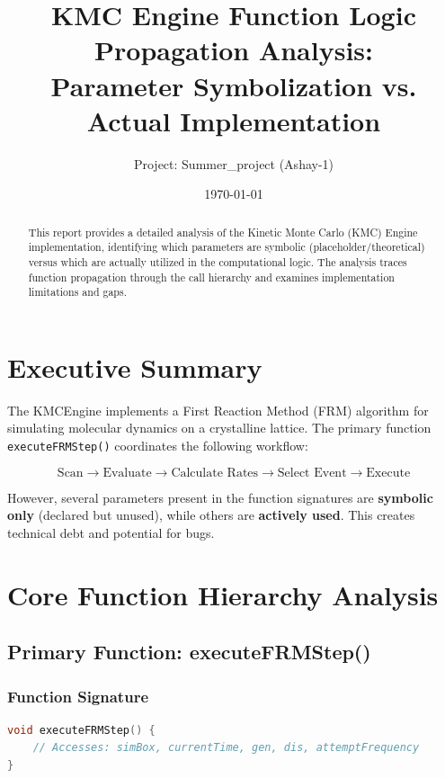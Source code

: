 \documentclass[11pt,a4paper]{article}
\title{\textbf{KMC Engine Function Logic Propagation Analysis:\\Parameter Symbolization vs. Actual Implementation}}
\author{Project: Summer\_project (Ashay-1)}
\date{\today}
\begin{document}
\maketitle

\begin{abstract}
This report provides a detailed analysis of the Kinetic Monte Carlo (KMC) Engine implementation, identifying which parameters are symbolic (placeholder/theoretical) versus which are actually utilized in the computational logic. The analysis traces function propagation through the call hierarchy and examines implementation limitations and gaps.
\end{abstract}

\tableofcontents
\newpage

\section{Executive Summary}

The KMCEngine implements a First Reaction Method (FRM) algorithm for simulating molecular dynamics on a crystalline lattice. The primary function \texttt{executeFRMStep()} coordinates the following workflow:

\begin{equation}
\text{Scan} \rightarrow \text{Evaluate} \rightarrow \text{Calculate Rates} \rightarrow \text{Select Event} \rightarrow \text{Execute}
\end{equation}

However, several parameters present in the function signatures are \textbf{symbolic only} (declared but unused), while others are \textbf{actively used}. This creates technical debt and potential for bugs.

\newpage

\section{Core Function Hierarchy Analysis}

\subsection{Primary Function: executeFRMStep()}

\subsubsection{Function Signature}
\begin{lstlisting}[language=C++, breaklines=true]
void executeFRMStep() {
    // Accesses: simBox, currentTime, gen, dis, attemptFrequency
}
\end{lstlisting}
\end{document}
